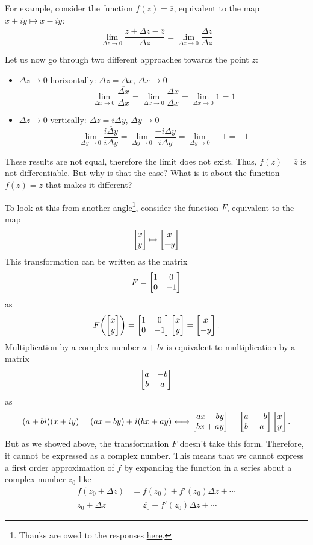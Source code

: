 \documentclass[10pt]{scrartcl}
\numberwithin{equation}{subsection}
\theoremstyle{definition}
\theoremstyle{remark}
\newcommand*{\conjugate}[1]{\overline{#1}}
\begin{document}
For example, consider the
function $f(z) = \conjugate{z}$, equivalent to the map $x+iy \mapsto x-iy$:
\[
	\lim_{\Delta z \to 0} \frac{\conjugate{z + \Delta z} -
	\conjugate{z}}{\Delta z} = \lim_{\Delta z \to 0}
	\frac{\conjugate{\Delta z}}{\Delta z}
\]

Let us now go through two different approaches towards the point $z$:
\begin{itemize}
	\item $\Delta z \to 0$ horizontally: $\Delta z = \Delta x$, $\Delta x \to 0$
		\[
			\lim_{\Delta x \to 0} \frac{\conjugate{\Delta x}}{\Delta x} = 
			\lim_{\Delta x \to 0} \frac{\Delta x}{\Delta x} = \lim_{\Delta x \to 0} 1 = 1
		\] 
	\item $\Delta z \to 0$ vertically: $\Delta z = i\Delta y$, $\Delta y \to 0$
		\[
			\lim_{\Delta y \to 0} \frac{\conjugate{i \Delta y}}{i \Delta y} = 
			\lim_{\Delta y \to 0} \frac{- i\Delta y}{i\Delta y} = \lim_{\Delta y \to 0}-1 = -1
		\]
\end{itemize}
These results are not equal, therefore the limit does not exist. Thus,
$f(z)=\conjugate{z}$ is not differentiable.
But why is that the case? What is it about the function
$f(z)=\conjugate{z}$ that makes it different?

To look at this from another angle\footnote{Thanks are
	owed to the responses
\href{http://math.stackexchange.com/questions/180849/why-is-the-complex-number-z-abi-equivalent-to-the-matrix-form-left-begins}{here}.},
consider the function
$F$, equivalent to the map
\[
	\bmqty{x \\ y} \mapsto \bmqty{x \\  -y} 
\] 
This transformation can be written as the matrix
\[
	F = \bmqty{1 & 0 \\ 0 & -1}
\]
as
\[
	F\pqty{\bmqty{x \\ y} }= \bmqty{1 & 0 \\ 0 & -1} \bmqty{x \\ y}  =
	\bmqty{x \\ -y}.
\]
Multiplication by a complex number $a + bi$ is equivalent
to multiplication by a matrix
\[
	\bmqty{a & -b \\ b & a}
\]
as
\[
	(a + bi) (x + iy) = (ax - by) + i(bx + ay) \longleftrightarrow
	\bmqty{ax - by \\ bx + ay} = \bmqty{a & -b \\ b & a} \bmqty{x \\ y}.
\]
But as we showed above, the transformation $F$ doesn't take this form.
Therefore, it cannot be expressed as a complex number. This means that we
cannot express a first order approximation of $f$ by expanding the function in a 
series about a complex number $z_0$ like
\begin{align*}
	f(z_0+\Delta z) &= f(z_0) + f'(z_0)\Delta z + \cdots \\	
	\conjugate{z_0 + \Delta z} &= \conjugate{z_0} + f'(z_0)\Delta z + \cdots
\end{align*}
\end{document}
